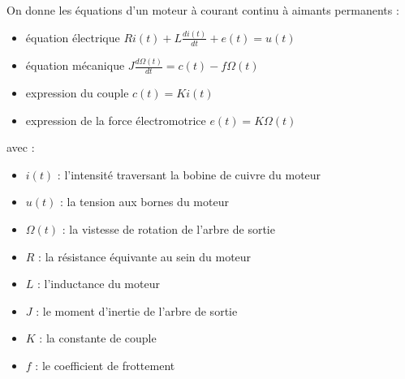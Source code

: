\newpage


On donne les \'equations d'un moteur \`a courant continu \`a aimants permanents :

\begin{itemize}
\item \'equation \'electrique $Ri(t)+L \frac{di(t)}{dt} + e(t) = u(t)$
\item \'equation m\'ecanique $J \frac{d \Omega (t)}{dt} = c(t) - f \Omega (t)$
\item expression du couple $c(t)=K i(t)$
\item expression de la force \'electromotrice $e(t) = K \Omega(t)$
\end{itemize}
avec :
\begin{itemize}
\item $i(t)$ : l'intensit\'e traversant la bobine de cuivre du moteur
\item $u(t)$ : la tension aux bornes du moteur
\item $\Omega(t)$ : la vistesse de rotation de l'arbre de sortie
\item $R$ : la r\'esistance \'equivante au sein du moteur
\item $L$ : l'inductance du moteur
\item $J$ : le moment d'inertie de l'arbre de sortie
\item $K$ : la constante de couple
\item $f$ : le coefficient de frottement
\end{itemize}

